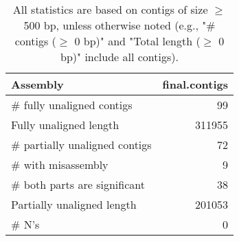 \documentclass[12pt,a4paper]{article}
\begin{document}
\begin{table}[ht]
\begin{center}
\caption{All statistics are based on contigs of size $\geq$ 500 bp, unless otherwise noted (e.g., "\# contigs ($\geq$ 0 bp)" and "Total length ($\geq$ 0 bp)" include all contigs).}
\begin{tabular}{|l*{1}{|r}|}
\hline
Assembly & final.contigs \\ \hline
\# fully unaligned contigs & 99 \\ \hline
Fully unaligned length & 311955 \\ \hline
\# partially unaligned contigs & 72 \\ \hline
\hspace{5mm}\# with misassembly & 9 \\ \hline
\hspace{5mm}\# both parts are significant & 38 \\ \hline
Partially unaligned length & 201053 \\ \hline
\# N's & 0 \\ \hline
\end{tabular}
\end{center}
\end{table}
\end{document}
